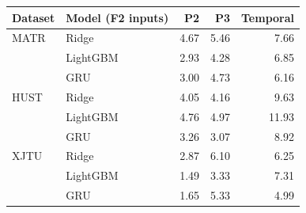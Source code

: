 \begin{tabular}{llrrr}
\toprule
Dataset & Model (F2 inputs) & P2 & P3 & Temporal \\
\midrule
MATR & Ridge & 4.67 & 5.46 & 7.66 \\
 & LightGBM & 2.93 & 4.28 & 6.85 \\
 & GRU & 3.00 & 4.73 & 6.16 \\
HUST & Ridge & 4.05 & 4.16 & 9.63 \\
 & LightGBM & 4.76 & 4.97 & 11.93 \\
 & GRU & 3.26 & 3.07 & 8.92 \\
XJTU & Ridge & 2.87 & 6.10 & 6.25 \\
 & LightGBM & 1.49 & 3.33 & 7.31 \\
 & GRU & 1.65 & 5.33 & 4.99 \\
\bottomrule
\end{tabular}

